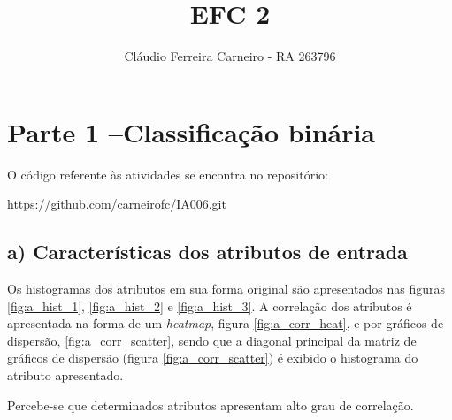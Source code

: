 \documentclass{article}
\author{Cláudio Ferreira Carneiro - RA 263796}
\title{EFC 2}
\begin{document}
    \maketitle
    \newpage
    \section[]{Parte 1 –Classificação binária}
    O código referente às atividades se encontra no repositório:
    
    https://github.com/carneirofc/IA006.git\linebreak
    \subsection[]{a) Características dos atributos de entrada}
        Os histogramas dos atributos em sua forma original são apresentados nas figuras \ref{fig:a_hist_1},
        \ref{fig:a_hist_2} e \ref{fig:a_hist_3}. A correlação dos atributos é apresentada
        na forma de um \textit{heatmap}, figura \ref{fig:a_corr_heat}, e por gráficos de dispersão, \ref{fig:a_corr_scatter},
        sendo que a diagonal principal da matriz de gráficos de dispersão (figura \ref{fig:a_corr_scatter})
        é exibido o histograma do atributo apresentado.

        Percebe-se que determinados atributos apresentam alto grau de correlação.
        
\end{document}
